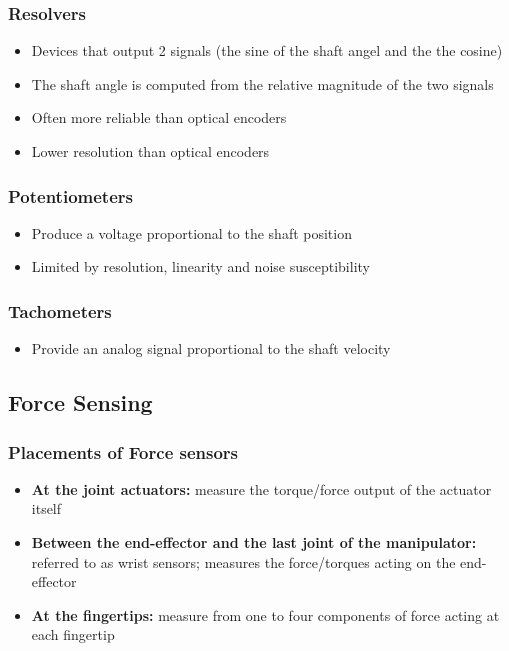 \documentclass[10pt,a4paper]{article}
\begin{document}
\subsubsection{Resolvers}
\begin{itemize}
	\item Devices that output 2 signals (the sine of the shaft angel and the the cosine)
	\item The shaft angle is computed from the relative magnitude of the two signals
	\item Often more reliable than optical encoders
	\item Lower resolution than optical encoders
\end{itemize}

\subsubsection{Potentiometers}
\begin{itemize}
	\item Produce a voltage proportional to the shaft position
	\item Limited by resolution, linearity and noise susceptibility
\end{itemize}

\subsubsection{Tachometers}
\begin{itemize}
	\item Provide an analog signal proportional to the shaft velocity
\end{itemize}

\subsection{Force Sensing}
\subsubsection{Placements of Force sensors}
\begin{itemize}
	\item \textbf{At the joint actuators:} measure the torque/force output of the actuator itself
	\item \textbf{Between the end-effector and the last joint of the manipulator:} referred to as wrist sensors; measures the force/torques acting on the end-effector
	\item \textbf{At the fingertips:} measure from one to four components of force acting at each fingertip
\end{itemize}
\end{document}
